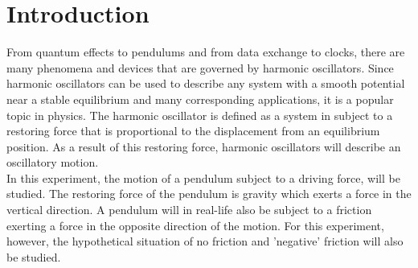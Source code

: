 \section{Introduction}

From quantum effects to pendulums and from data exchange to clocks, there are many phenomena and devices that are governed by harmonic oscillators. Since harmonic oscillators can be used to describe any system with a smooth potential near a stable equilibrium and many corresponding applications, it is a popular topic in physics. The harmonic oscillator is defined as a system in subject to a restoring force that is proportional to the displacement from an equilibrium position. As a result of this restoring force, harmonic oscillators will describe an oscillatory motion. \\
In this experiment, the motion of a pendulum subject to a driving force, will be studied. The restoring force of the pendulum is gravity which exerts a force in the vertical direction. A pendulum will in real-life also be subject to a friction exerting a force in the opposite direction of the motion. For this experiment, however, the hypothetical situation of no friction and 'negative' friction will also be studied. 
